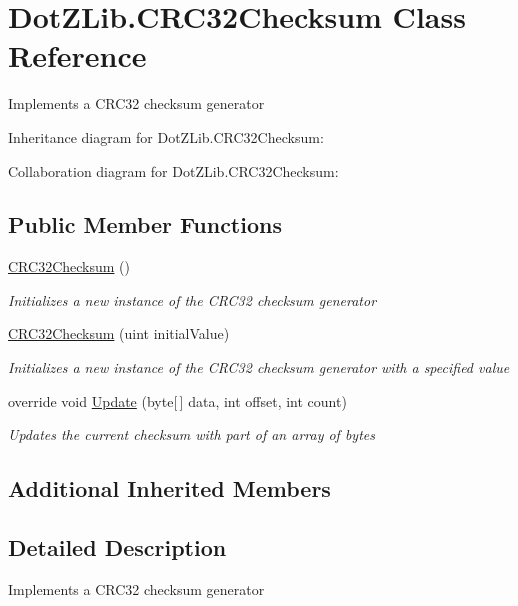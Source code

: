 \hypertarget{class_dot_z_lib_1_1_c_r_c32_checksum}{\section{Dot\+Z\+Lib.\+C\+R\+C32\+Checksum Class Reference}
\label{class_dot_z_lib_1_1_c_r_c32_checksum}
}


Implements a C\+R\+C32 checksum generator  




Inheritance diagram for Dot\+Z\+Lib.\+C\+R\+C32\+Checksum\+:


Collaboration diagram for Dot\+Z\+Lib.\+C\+R\+C32\+Checksum\+:
\subsection*{Public Member Functions}
\begin{DoxyCompactItemize}
\item 
\hyperlink{class_dot_z_lib_1_1_c_r_c32_checksum_aae1fb7dbf6c57d17c321d0065cd608ca}{C\+R\+C32\+Checksum} ()
\begin{DoxyCompactList}\small\item\em Initializes a new instance of the C\+R\+C32 checksum generator \end{DoxyCompactList}\item 
\hyperlink{class_dot_z_lib_1_1_c_r_c32_checksum_a7032fdb98254bd918ff19b5251c29634}{C\+R\+C32\+Checksum} (uint initial\+Value)
\begin{DoxyCompactList}\small\item\em Initializes a new instance of the C\+R\+C32 checksum generator with a specified value \end{DoxyCompactList}\item 
override void \hyperlink{class_dot_z_lib_1_1_c_r_c32_checksum_abe29e66033fa164a7c7c0463e6c88074}{Update} (byte\mbox{[}$\,$\mbox{]} data, int offset, int count)
\begin{DoxyCompactList}\small\item\em Updates the current checksum with part of an array of bytes \end{DoxyCompactList}\end{DoxyCompactItemize}
\subsection*{Additional Inherited Members}


\subsection{Detailed Description}
Implements a C\+R\+C32 checksum generator 



